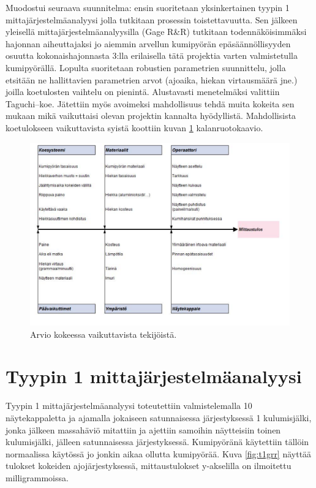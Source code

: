 \documentclass[12pt,a4paper,finnish]{tutthesis}
\begin{document}
Muodostui seuraava suunnitelma: ensin suoritetaan yksinkertainen
tyypin 1 mittajärjestelmäanalyysi jolla tutkitaan
prosessin toistettavuutta. Sen
jälkeen yleisellä mittajärjestelmäanalyysilla (Gage R\&R) tutkitaan
todennäköisimmäksi hajonnan aiheuttajaksi jo aiemmin arvellun kumipyörän
epäsäännöllisyyden osuutta kokonaishajonnasta 3:lla erilaisella tätä
projektia varten valmistetulla kumipyörällä. Lopulta suoritetaan
robustien parametrien suunnittelu, jolla etsitään ne
hallittavien parametrien arvot (ajoaika, hiekan virtausmäärä jne.)
joilla koetulosten vaihtelu on pienintä. Alustavasti menetelmäksi valittiin
Taguchi–koe. Jätettiin myös avoimeksi mahdollisuus tehdä muita
kokeita sen mukaan mikä vaikuttaisi olevan projektin kannalta
hyödyllistä. Mahdollisista koetulokseen vaikuttavista syistä koottiin
kuvan \ref{fig:ruoto1} kalanruotokaavio.

\begin{figure}
  \begin{center}
    \includegraphics[width=1.0\textwidth]{Capture7}
  \end{center}
  \caption[Kalanruotokaavio abraasiokokeesta]{Arvio kokeessa vaikuttavista tekijöistä.}
  \label{fig:ruoto1}
\end{figure}

\section{Tyypin 1 mittajärjestelmäanalyysi}

Tyypin 1 mittajärjestelmäanalyysi toteutettiin valmistelemalla 10 näytekappaletta ja ajamalla jokaiseen satunnaisessa järjestyksessä 1 kulumisjälki, jonka jälkeen massahäviö mitattiin ja ajettiin samoihin näytteisiin toinen kulumisjälki, jälleen satunnaisessa järjestyksessä. Kumipyöränä käytettiin tällöin
normaalissa käytössä jo jonkin aikaa ollutta kumipyörää.
Kuva \ref{fig:t1grr} näyttää tulokset kokeiden ajojärjestyksessä, mittaustulokset y-akselilla on ilmoitettu milligrammoissa.
\end{document}
